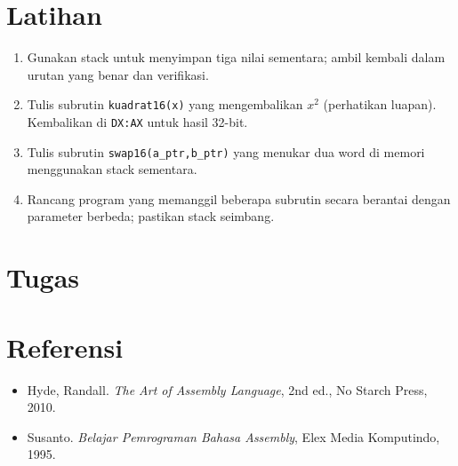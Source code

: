 \section{Latihan}
\begin{enumerate}
  \item Gunakan stack untuk menyimpan tiga nilai sementara; ambil kembali dalam urutan yang benar dan verifikasi.
  \item Tulis subrutin \texttt{kuadrat16(x)} yang mengembalikan \(x^2\) (perhatikan luapan). Kembalikan di \texttt{DX:AX} untuk hasil 32-bit.
  \item Tulis subrutin \texttt{swap16(a\_ptr,b\_ptr)} yang menukar dua word di memori menggunakan stack sementara.
  \item Rancang program yang memanggil beberapa subrutin secara berantai dengan parameter berbeda; pastikan stack seimbang.
\end{enumerate}

\section{Tugas}

\section{Referensi}
\begin{itemize}
  \item Hyde, Randall. \textit{The Art of Assembly Language}, 2nd ed., No Starch Press, 2010.
  \item Susanto. \textit{Belajar Pemrograman Bahasa Assembly}, Elex Media Komputindo, 1995.
\end{itemize}
